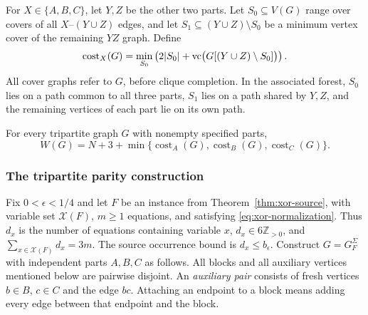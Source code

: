 For $X\in\{A,B,C\}$, let $Y,Z$ be the other two parts. Let
$S_0\subseteq V(G)$ range over covers of all $X$--$(Y\cup Z)$ edges, and let
$S_1\subseteq(Y\cup Z)\setminus S_0$ be a minimum vertex cover of
the remaining $YZ$ graph. Define
\begin{equation}\label{eq:np-total-depth-cover-cost}
 \operatorname{cost}_X(G)=\min_{S_0}
 \left(2|S_0|+\operatorname{vc}\bigl(G[(Y\cup Z)\setminus S_0]\bigr)\right).
\end{equation}
All cover graphs refer to $G$, before clique completion. In the
associated forest, $S_0$ lies on a path common to all three parts,
$S_1$ lies on a path shared by $Y,Z$, and the remaining vertices of
each part lie on its own path.

\begin{lemma}
\label{lem:np-total-depth-path-cost}
For every tripartite graph $G$ with nonempty specified parts,
\begin{equation}\label{eq:np-total-depth-path-cost-formula}
 W(G)=N+3+\min\{\operatorname{cost}_A(G),
                 \operatorname{cost}_B(G),\operatorname{cost}_C(G)\}.
\end{equation}
\end{lemma}

\subsubsection{The tripartite parity construction}

Fix $0<\epsilon<1/4$ and let $F$ be an instance from
Theorem~\ref{thm:xor-source}, with variable set $\mathcal X(F)$,
$m\geq1$ equations, and satisfying
\eqref{eq:xor-normalization}. Thus $d_x$ is the number of equations
containing variable $x$, $d_x\in6\mathbb Z_{>0}$, and
$\sum_{x\in\mathcal X(F)}d_x=3m$. The source occurrence bound is $d_x\leq b_\epsilon$.
Construct $G=G_F^\Sigma$ with independent parts $A,B,C$ as follows.
All blocks and all auxiliary vertices mentioned below are pairwise
disjoint. An \emph{auxiliary pair} consists of fresh vertices
$b\in B$, $c\in C$ and the edge $bc$. Attaching an endpoint to a
block means adding every edge between that endpoint and the block.


